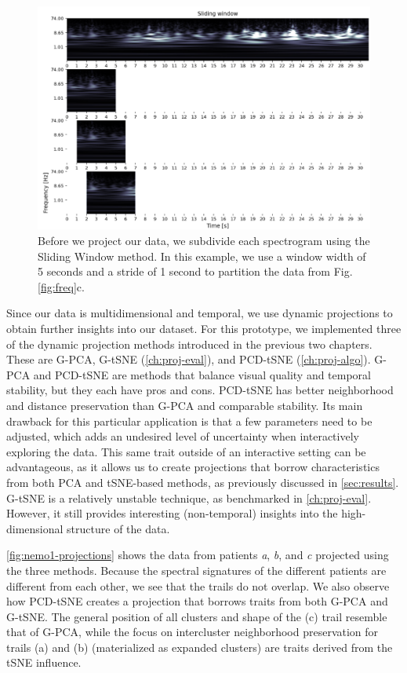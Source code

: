 \begin{figure}[ht]
\centering
\includegraphics[width=\linewidth]{figures/nemo/sliding.png}
\caption{Before we project our data, we subdivide each spectrogram using the Sliding Window method. In this example, we use a window width of 5 seconds and a stride of 1 second to partition the data from Fig. \ref{fig:freq}c.}
\label{fig:sliding}
\end{figure}

Since our data is multidimensional and temporal, we use dynamic projections to obtain further insights into our dataset.
For this prototype, we implemented three of the dynamic projection methods introduced in the previous two chapters. These are G-PCA, G-tSNE (\cref{ch:proj-eval}), and PCD-tSNE (\cref{ch:proj-algo}). 
G-PCA and PCD-tSNE are methods that balance visual quality and temporal stability, but they each have pros and cons. PCD-tSNE has better neighborhood and distance preservation than G-PCA and comparable stability. Its main drawback for this particular application is that a few parameters need to be adjusted, which adds an undesired level of uncertainty when interactively exploring the data. This same trait outside of an interactive setting can be advantageous, as it allows us to create projections that borrow characteristics from both PCA and tSNE-based methods, as previously discussed in \cref{sec:results}. %
G-tSNE is a relatively unstable technique, as benchmarked in \cref{ch:proj-eval}. However, it still provides interesting (non-temporal) insights into the high-dimensional structure of the data.

\cref{fig:nemo1-projections} shows the data from patients \textit{a}, \textit{b}, and \textit{c} projected using the three methods. Because the spectral signatures of the different patients are different from each other, we see that the trails do not overlap. We also observe how PCD-tSNE creates a projection that borrows traits from both G-PCA and G-tSNE. The general position of all clusters and shape of the (c) trail resemble that of G-PCA, while the focus on intercluster neighborhood preservation for trails (a) and (b) (materialized as expanded clusters) are traits derived from the tSNE influence.

